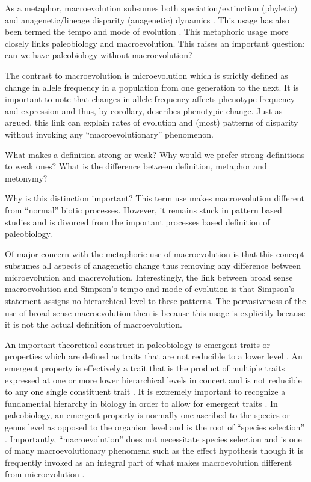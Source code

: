 \documentclass[12pt,letterpaper]{article}
\begin{document}
As a metaphor, macroevolution subsumes both speciation/extinction (phyletic) and anagenetic/lineage disparity (anagenetic) dynamics \citep{Foote2007b}. This usage has also been termed the tempo and mode of evolution \citep{Simpson1944}. This metaphoric usage more closely links paleobiology and macroevolution. This raises an important question: can we have paleobiology without macroevolution? 

The contrast to macroevolution is microevolution \citep{Simpson1944,Foote2007b} which is strictly defined as change in allele frequency in a population from one generation to the next. It is important to note that changes in allele frequency affects phenotype frequency and expression and thus, by corollary, describes phenotypic change. Just as \citet{Simpson1944} argued, this link can explain rates of evolution and (most) patterns of disparity without invoking any ``macroevolutionary'' phenomenon.

What makes a definition strong or weak? Why would we prefer strong definitions to weak ones? What is the difference between definition, metaphor and metonymy?

Why is this distinction important? This term use makes macroevolution different from ``normal'' biotic processes. However, it remains stuck in pattern based studies and is divorced from the important processes based definition of paleobiology. 

Of major concern with the metaphoric use of macroevolution is that this concept subsumes all aspects of anagenetic change thus removing any difference between microevolution and macrevolution. Interestingly, the link between broad sense macroevolution and Simpson's tempo and mode of evolution is that Simpson's statement assigns no hierarchical level to these patterns. The pervasiveness of the use of broad sense macroevolution then is because this usage is explicitly because it is not the actual definition of macroevolution. 

An important theoretical construct in paleobiology is emergent traits or properties which are defined as traits that are not reducible to a lower level \citep{Grantham1995,Vrba1984,Jablonski2008a,Lloyd1993}. An emergent property is effectively a trait that is the product of multiple traits expressed at one or more lower hierarchical levels in concert and is not reducible to any one single constituent trait \citep{Vrba1984,Jablonski2008a}. It is extremely important to recognize a fundamental hierarchy in biology in order to allow for emergent traits \citep{Vrba1984}. In paleobiology, an emergent property is normally one ascribed to the species or genus level as opposed to the organism level and is the root of ``species selection'' \citep{Jablonski2008a,Vrba1984,Lloyd1993,Grantham1995}. Importantly, ``macroevolution'' does not necessitate species selection and is one of many macroevolutionary phenomena such as the effect hypothesis \citep{Vrba1983,Jablonski2008a,Kitchell1985a} though it is frequently invoked as an integral part of what makes macroevolution different from microevolution \citep{Grantham1995,Jablonski2008}.
\end{document}
